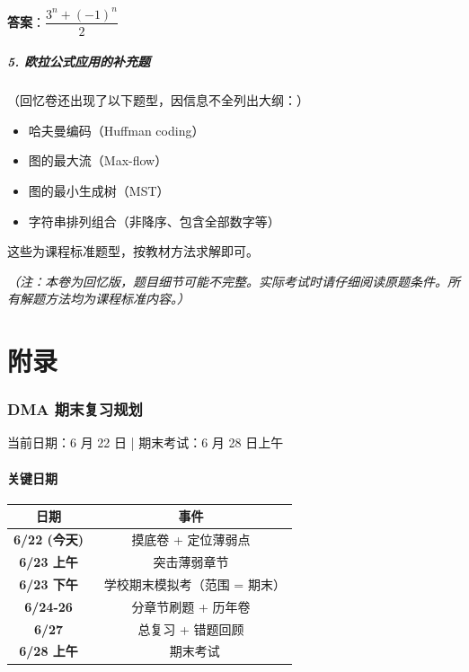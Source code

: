 \documentclass[10pt,a4paper,openany]{ctexbook}
\theoremstyle{definition}
\theoremstyle{remark}
\renewenvironment{quote}
  {\list{}{\leftmargin=1em\rightmargin=0pt\topsep=0.5pt\partopsep=0pt}\item[]}
  {\endlist}
\begin{document}
\textbf{答案}：$\boxed{\dfrac{3^n + (-1)^n}{2}}$
\vspace{-2pt}

\subsubsection{5. 欧拉公式应用的补充题}

（回忆卷还出现了以下题型，因信息不全列出大纲：）
\begin{itemize}
\item 哈夫曼编码（Huffman coding）
\item 图的最大流（Max-flow）
\item 图的最小生成树（MST）
\item 字符串排列组合（非降序、包含全部数字等）

\end{itemize}

这些为课程标准题型，按教材方法求解即可。
\vspace{-2pt}

\textit{（注：本卷为回忆版，题目细节可能不完整。实际考试时请仔细阅读原题条件。所有解题方法均为课程标准内容。）}

\part{附录}

\section{DMA 期末复习规划}

\begin{quote}
当前日期：6 月 22 日 | 期末考试：6 月 28 日上午

\end{quote}
\vspace{-2pt}

\subsection{关键日期}

\begin{center}
\begin{tabular}{cc}
\hline
日期 & 事件 \\ \hline
\textbf{6/22 (今天)} & 摸底卷 + 定位薄弱点 \\
\textbf{6/23 上午} & 突击薄弱章节 \\
\textbf{6/23 下午} & 🎯 学校期末模拟考（范围 = 期末） \\
\textbf{6/24-26} & 分章节刷题 + 历年卷 \\
\textbf{6/27} & 总复习 + 错题回顾 \\
\textbf{6/28 上午} & 🏁 期末考试 \\
\hline
\end{tabular}

\end{center}
\end{document}
